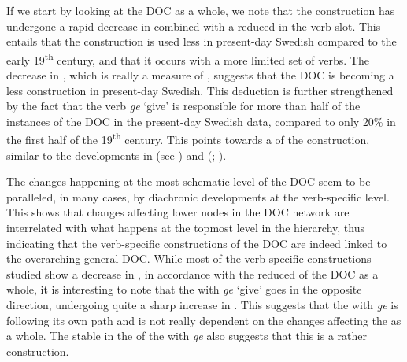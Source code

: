 \documentclass[output=paper]{langscibook}
\begin{document}
If we start by looking at the DOC as a whole, we note that the construction has undergone a rapid decrease in  combined with a reduced  in the verb slot. This entails that the construction is used less in present-day Swedish compared to the early 19\textsuperscript{th} century, and that it occurs with a more limited set of verbs. The decrease in , which is really a measure of , suggests that the DOC is becoming a less  construction in present-day Swedish. This deduction is further strengthened by the fact that the verb \textit{ge} ‘give’ is responsible for more than half of the instances of the DOC in the present-day Swedish data, compared to only 20\% in the first half of the 19\textsuperscript{th} century. This points towards a  of the construction, similar to the developments in  (see \citealt{Colleman2011}) and  (\citealt{CollemanDe_Clerck2011}; \citealt{Zehentner2018}).



The changes happening at the most schematic level of the DOC seem to be paralleled, in many cases, by diachronic developments at the verb-specific level. This shows that changes affecting lower nodes in the DOC network are interrelated with what happens at the topmost level in the hierarchy, thus indicating that the verb-specific constructions of the DOC are indeed linked to the overarching general DOC. While most of the verb-specific constructions studied show a decrease in , in accordance with the reduced  of the DOC as a whole, it is interesting to note that the  with \textit{ge} ‘give’ goes in the opposite direction, undergoing quite a sharp increase in . This suggests that the  with \textit{ge} is following its own path and is not really dependent on the changes affecting the  as a whole. The stable  in the  of the  with \textit{ge} also suggests that this is a rather  construction.
\end{document}
